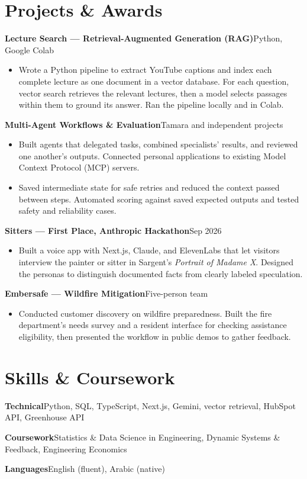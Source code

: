 \documentclass[a4paper,10pt]{article}
\newcommand{\resumeProjectHeading}[2]{\par\addvspace{3pt}\textbf{#1}\hfill #2\par}
\begin{document}
\section*{Projects \& Awards}
\resumeProjectHeading{Lecture Search --- Retrieval-Augmented Generation (RAG)}{Python, Google Colab}
\begin{itemize}
\item Wrote a Python pipeline to extract YouTube captions and index each complete lecture as one document in a vector database. For each question, vector search retrieves the relevant lectures, then a model selects passages within them to ground its answer. Ran the pipeline locally and in Colab.
\end{itemize}
\resumeProjectHeading{Multi-Agent Workflows \& Evaluation}{Tamara and independent projects}
\begin{itemize}
\item Built agents that delegated tasks, combined specialists' results, and reviewed one another's outputs. Connected personal applications to existing Model Context Protocol (MCP) servers.
\item Saved intermediate state for safe retries and reduced the context passed between steps. Automated scoring against saved expected outputs and tested safety and reliability cases.
\end{itemize}
\resumeProjectHeading{Sitters --- First Place, Anthropic Hackathon}{Sep 2026}
\begin{itemize}
\item Built a voice app with Next.js, Claude, and ElevenLabs that let visitors interview the painter or sitter in Sargent's \textit{Portrait of Madame X}. Designed the personas to distinguish documented facts from clearly labeled speculation.
\end{itemize}
\resumeProjectHeading{Embersafe --- Wildfire Mitigation}{Five-person team}
\begin{itemize}
\item Conducted customer discovery on wildfire preparedness. Built the fire department's needs survey and a resident interface for checking assistance eligibility, then presented the workflow in public demos to gather feedback.
\end{itemize}

\section*{Skills \& Coursework}
\textbf{Technical}\quad Python, SQL, TypeScript, Next.js, Gemini, vector retrieval, HubSpot API, Greenhouse API\par
\textbf{Coursework}\quad Statistics \& Data Science in Engineering, Dynamic Systems \& Feedback, Engineering Economics\par
\textbf{Languages}\quad English (fluent), Arabic (native)
\end{document}
